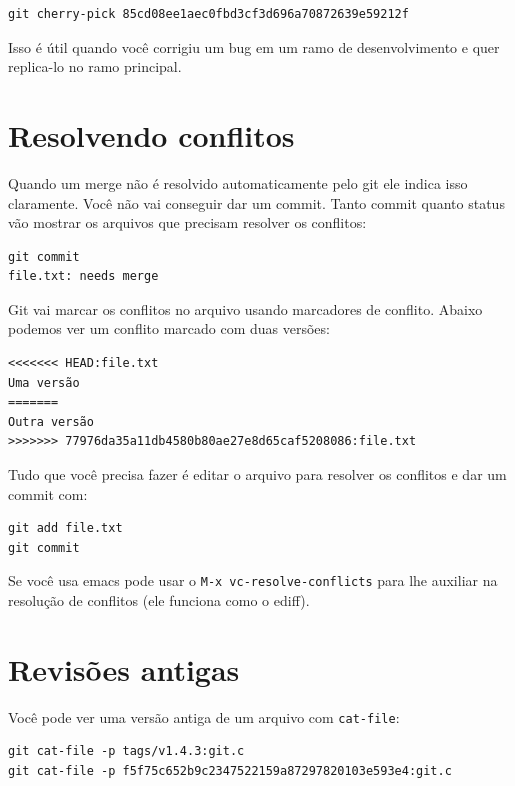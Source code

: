 \documentclass[12pt,brazil]{book}
\begin{document}
\begin{verbatim}
git cherry-pick 85cd08ee1aec0fbd3cf3d696a70872639e59212f
\end{verbatim}

Isso é útil quando você corrigiu um bug em um ramo de desenvolvimento
e quer replica-lo no ramo principal.

\section{Resolvendo conflitos}
\label{sec:resolvendo-conflitos}

Quando um merge não é resolvido automaticamente pelo git ele indica
isso claramente. Você não vai conseguir dar um commit. Tanto commit
quanto status vão mostrar os arquivos que precisam resolver os
conflitos:

\begin{verbatim}
git commit
file.txt: needs merge
\end{verbatim}

Git vai marcar os conflitos no arquivo usando marcadores de conflito.
Abaixo podemos ver um conflito marcado com duas versões:

\begin{verbatim}
<<<<<<< HEAD:file.txt
Uma versão
=======
Outra versão
>>>>>>> 77976da35a11db4580b80ae27e8d65caf5208086:file.txt
\end{verbatim}

Tudo que você precisa fazer é editar o arquivo para resolver os
conflitos e dar um commit com:

\begin{verbatim}
git add file.txt
git commit
\end{verbatim}

Se você usa emacs pode usar o \texttt{M-x vc-resolve-conflicts} para
lhe auxiliar na resolução de conflitos (ele funciona como o ediff).

\section{Revisões antigas}
\label{sec:revisoes-antigas}

Você pode ver uma versão antiga de um arquivo com \texttt{cat-file}:

\begin{verbatim}
git cat-file -p tags/v1.4.3:git.c
git cat-file -p f5f75c652b9c2347522159a87297820103e593e4:git.c
\end{verbatim}
\end{document}
